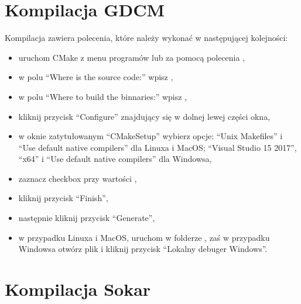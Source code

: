 \section{Kompilacja GDCM}

Kompilacja zawiera polecenia, które należy wykonać w następującej kolejności:
\begin{itemize}
    \item uruchom CMake z menu programów lub za pomocą polecenia ,
    \item w polu \enquote{Where is the source code:} wpisz ,
    \item w polu \enquote{Where to build the binnaries:} wpisz ,
    \item kliknij przycisk \enquote{Configure} znajdujący się w dolnej lewej części okna,
    \item w oknie zatytułowanym \enquote{CMakeSetup} wybierz opcje: \enquote{Unix Makefiles} i \enquote{Use default native compilers} dla Linuxa i MacOS; \enquote{Visual Studio 15 2017}, \enquote{x64} i \enquote{Use default native compilers} dla Windowsa,
    \item zaznacz checkbox przy wartości ,
    \item kliknij przycisk \enquote{Finish},
    \item następnie kliknij przycisk \enquote{Generate},
    \item w przypadku Linuxa i MacOS, uruchom  w folderze , zaś w przypadku Windowsa otwórz plik  i kliknij przycisk \enquote{Lokalny debuger Windows}.
\end{itemize}

\section{Kompilacja Sokar}

